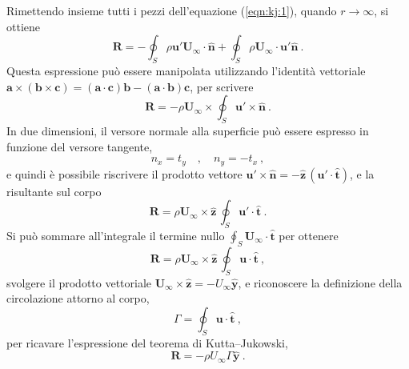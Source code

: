 Rimettendo insieme tutti i pezzi dell'equazione (\ref{eqn:kj:1}), quando $r \rightarrow \infty$, si ottiene
\begin{equation}
 \bm{R} = - \oint_S \rho \bm{u}' \bm{U}_{\infty}\cdot \bm{\hat{n}} 
          + \oint_S \rho \bm{U}_{\infty} \cdot \bm{u}' \bm{\hat{n}} \ .
\end{equation}
Questa espressione può essere manipolata utilizzando l'identità vettoriale $\bm{a} \times (\bm{b} \times \bm{c} ) = (\bm{a} \cdot \bm{c}) \bm{b} - (\bm{a} \cdot \bm{b}) \bm{c}$, per scrivere
\begin{equation}
 \bm{R} = - \rho \bm{U}_\infty \times \oint_S \bm{u}' \times \bm{\hat{n}} \ .
\end{equation}
In due dimensioni, il versore normale alla superficie può essere espresso in funzione del versore tangente,
\begin{equation}
 n_x = t_y \quad , \quad n_y = - t_x \ ,
\end{equation}
e quindi è possibile riscrivere il prodotto vettore $\bm{u}' \times \bm{\hat{n}} = -\bm{\hat{z}} \,(\bm{u}' \cdot \bm{\hat{t}})$, e la risultante sul corpo
\begin{equation}
 \bm{R} = \rho \bm{U}_\infty \times \bm{\hat{z}} \, \oint_S \bm{u}' \cdot \bm{\hat{t}} \ .
\end{equation}
Si può sommare all'integrale il termine nullo $\oint_S \bm{U}_{\infty} \cdot \bm{\hat{t}}$ per ottenere\begin{equation}
 \bm{R} = \rho \bm{U}_\infty \times \bm{\hat{z}} \, \oint_S \bm{u} \cdot \bm{\hat{t}} \ ,
\end{equation}
svolgere il prodotto vettoriale $\bm{U}_{\infty} \times \bm{\hat{z}} = - U_{\infty} \bm{\hat{y}}$, e riconoscere la definizione della circolazione attorno al corpo,
\begin{equation}
 \Gamma = \oint_S \bm{u} \cdot \bm{\hat{t}} \ ,
\end{equation}
per ricavare l'espressione del teorema di Kutta--Jukowski,
\begin{equation}
 \bm{R} = -\rho U_{\infty} \Gamma \bm{\hat{y}} \ .
\end{equation}



